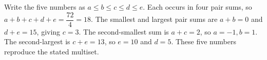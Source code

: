 Write the five numbers as $a\le b\le c\le d\le e$. Each occurs in four pair sums, so $a+b+c+d+e=\dfrac{72}{4}=18$. The smallest and largest pair sums are $a+b=0$ and $d+e=15$, giving $c=3$. The second-smallest sum is $a+c=2$, so $a=-1,b=1$. The second-largest is $c+e=13$, so $e=\boxed{10}$ and $d=5$. These five numbers reproduce the stated multiset.
